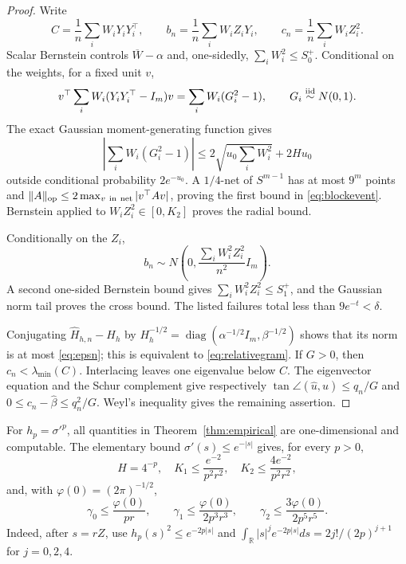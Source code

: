\documentclass[11pt]{article}
\newcommand{\R}{\mathbb R}
\begin{document}
\begin{proof}
Write
\[
 C=\frac1n\sum_iW_iY_iY_i^\top,\qquad
 b_n=\frac1n\sum_iW_iZ_iY_i,\qquad
 c_n=\frac1n\sum_iW_iZ_i^2.
\]
Scalar Bernstein controls $\overline W-\alpha$ and, one-sidedly,
$\sum_iW_i^2\le S_0^+$.  Conditional on the weights, for a fixed unit $v$,
\[
 v^\top\sum_iW_i(Y_iY_i^\top-I_m)v=\sum_iW_i(G_i^2-1),
 \qquad G_i\stackrel{\rm iid}{\sim}N(0,1).
\]
The exact Gaussian moment-generating function gives
\[
 \left|\sum_iW_i(G_i^2-1)\right|
 \le2\sqrt{u_0\sum_iW_i^2}+2Hu_0
\]
outside conditional probability $2e^{-u_0}$.  A $1/4$-net of $S^{m-1}$ has at most $9^m$ points and
$\lVert A\rVert_{\rm op}\le2\max_{v\ {\rm in\ net}}|v^\top Av|$, proving the first bound in
\eqref{eq:blockevent}.  Bernstein applied to $W_iZ_i^2\in[0,K_2]$ proves the radial bound.

Conditionally on the $Z_i$,
\[
 b_n\sim N\!\left(0,\frac{\sum_iW_i^2Z_i^2}{n^2}I_m\right).
\]
A second one-sided Bernstein bound gives $\sum_iW_i^2Z_i^2\le S_1^+$, and the Gaussian norm tail proves the
cross bound.  The listed failures total less than $9e^{-t}<\delta$.

Conjugating $\widehat H_{h,n}-H_h$ by
$H_h^{-1/2}=\operatorname{diag}(\alpha^{-1/2}I_m,\beta^{-1/2})$ shows that its norm is at most
\eqref{eq:epsn}; this is equivalent to \eqref{eq:relativegram}.  If $G>0$, then
$c_n<\lambda_{\min}(C)$.  Interlacing leaves one eigenvalue below $C$.
The eigenvector equation and the Schur complement give respectively
$\tan\angle(\widehat u,u)\le q_n/G$ and
$0\le c_n-\widehat\beta\le q_n^2/G$.  Weyl's inequality gives the remaining assertion.
\end{proof}

For $h_p=\sigma'^p$, all quantities in Theorem~\ref{thm:empirical} are one-dimensional and computable.
The elementary bound $\sigma'(s)\le e^{-|s|}$ gives, for every $p>0$,
\begin{equation}
 H=4^{-p},\quad K_1\le\frac{e^{-2}}{p^2r^2},\quad
 K_2\le\frac{4e^{-2}}{p^2r^2},
 \label{eq:envelopes}
\end{equation}
and, with $\varphi(0)=(2\pi)^{-1/2}$,
\begin{equation}
 \gamma_0\le\frac{\varphi(0)}{pr},\qquad
 \gamma_1\le\frac{\varphi(0)}{2p^3r^3},\qquad
 \gamma_2\le\frac{3\varphi(0)}{2p^5r^5}.
 \label{eq:gammabounds}
\end{equation}
Indeed, after $s=rZ$, use $h_p(s)^2\le e^{-2p|s|}$ and
$\int_\R |s|^je^{-2p|s|}ds=2j!/(2p)^{j+1}$ for $j=0,2,4$.
\end{document}
